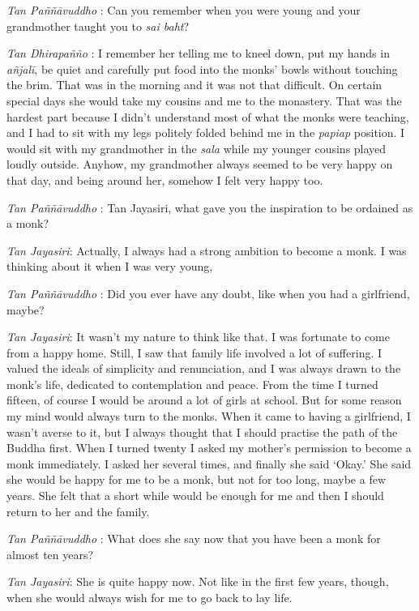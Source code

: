 \emph{Tan Paññāvuddho} : Can you remember when you were young and your
grandmother taught you to \emph{sai baht}?

\emph{Tan Dhirapañño} : I remember her telling me to kneel down, put my
hands in \emph{añjalī}, be quiet and carefully put food into the monks'
bowls without touching the brim. That was in the morning and it was not
that difficult. On certain special days she would take my cousins and me
to the monastery. That was the hardest part because I didn't understand
most of what the monks were teaching, and I had to sit with my legs
politely folded behind me in the \emph{papiap} position. I would sit
with my grandmother in the \emph{sala} while my younger cousins played
loudly outside. Anyhow, my grandmother always seemed to be very happy on
that day, and being around her, somehow I felt very happy too.

\emph{Tan Paññāvuddho} : Tan Jayasiri, what gave you the inspiration to
be ordained as a monk?

\emph{Tan Jayasiri}: Actually, I always had a strong ambition to become
a monk. I was thinking about it when I was very young,

\emph{Tan Paññāvuddho} : Did you ever have any doubt, like when you had
a girlfriend, maybe?

\emph{Tan Jayasiri}: It wasn't my nature to think like that. I was
fortunate to come from a happy home. Still, I saw that family life
involved a lot of suffering. I valued the ideals of simplicity and
renunciation, and I was always drawn to the monk's life, dedicated to
contemplation and peace. From the time I turned fifteen, of course I
would be around a lot of girls at school. But for some reason my mind
would always turn to the monks. When it came to having a girlfriend, I
wasn't averse to it, but I always thought that I should practise the
path of the Buddha first. When I turned twenty I asked my mother's
permission to become a monk immediately. I asked her several times, and
finally she said `Okay.' She said she would be happy for me to be a
monk, but not for too long, maybe a few years. She felt that a short
while would be enough for me and then I should return to her and the
family.

\emph{Tan Paññāvuddho} : What does she say now that you have been a monk
for almost ten years?

\emph{Tan Jayasiri}: She is quite happy now. Not like in the first few
years, though, when she would always wish for me to go back to lay life.


